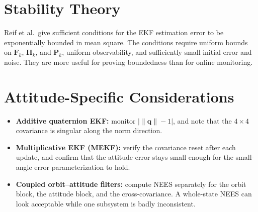 \documentclass[11pt]{article}
\newcommand{\Pm}{\bm{P}}
\newcommand{\Hm}{\bm{H}}
\newcommand{\Fm}{\bm{F}}
\begin{document}
\section{Stability Theory}
\label{sec:stability}
Reif et al.\ give sufficient conditions for the EKF estimation error to be exponentially
bounded in mean square. The conditions require uniform bounds on $\Fm_k$, $\Hm_k$, and
$\Pm_k$, uniform observability, and sufficiently small initial error and noise. They are
more useful for proving boundedness than for online monitoring.

\section{Attitude-Specific Considerations}
\label{sec:attitude}
\begin{itemize}
  \item \textbf{Additive quaternion EKF:} monitor $\big|\|\bm{q}\| - 1\big|$, and note
        that the $4\times4$ covariance is singular along the norm direction.
  \item \textbf{Multiplicative EKF (MEKF):} verify the covariance reset after each update,
        and confirm that the attitude error stays small enough for the small-angle
        error parameterization to hold.
  \item \textbf{Coupled orbit--attitude filters:} compute NEES separately for the orbit
        block, the attitude block, and the cross-covariance. A whole-state NEES can look
        acceptable while one subsystem is badly inconsistent.
\end{itemize}

\end{document}
